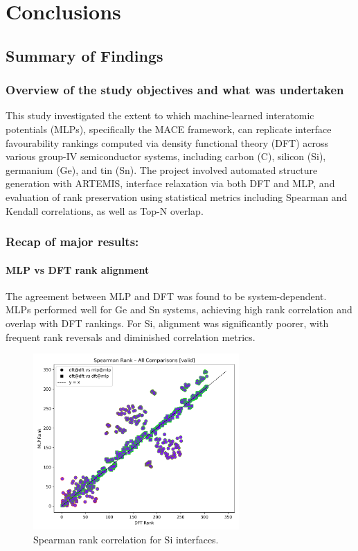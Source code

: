 \chapter{Conclusions} \label{chapter:conclusions}

\section{Summary of Findings} \label{section:summary_of_findings}

\subsection{Overview of the study objectives and what was undertaken}

This study investigated the extent to which machine-learned interatomic potentials (MLPs), specifically the MACE framework, can replicate interface favourability rankings computed via density functional theory (DFT) across various group-IV semiconductor systems, including carbon (C), silicon (Si), germanium (Ge), and tin (Sn). The project involved automated structure generation with ARTEMIS, interface relaxation via both DFT and MLP, and evaluation of rank preservation using statistical metrics including Spearman and Kendall correlations, as well as Top-N overlap.

\subsection{Recap of major results:}

\subsubsection{MLP vs DFT rank alignment}

The agreement between MLP and DFT was found to be system-dependent. MLPs performed well for Ge and Sn systems, achieving high rank correlation and overlap with DFT rankings. For Si, alignment was significantly poorer, with frequent rank reversals and diminished correlation metrics.

\begin{figure}[h]
    \centering
    \includegraphics[width=0.7\textwidth]{analysis/plots/results_lower_Si_spearman_all_comparisons_valid.png}
    \caption{Spearman rank correlation for Si interfaces.}
\end{figure}

